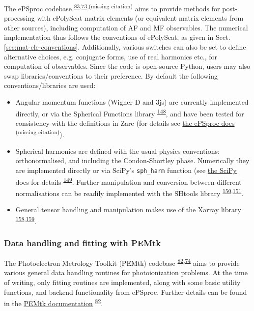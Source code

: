 \documentclass[10pt]{article}
\begin{document}
The ePSproc codebase \textsuperscript{\hyperref[csl:83]{83},\hyperref[csl:73]{73},(missing citation)} aims to provide methods for post-processing with ePolyScat matrix elements (or equivalent matrix elements from other sources), including computation of AF and MF observables. The numerical implementation thus follows the conventions of ePolyScat, as given in Sect. \ref{sec:mat-ele-conventions}. Additionally, various switches can also be set to define alternative choices, e.g. conjugate forms, use of real harmonics etc., for computation of observables. Since the code is open-source Python, users may also swap libraries/conventions to their preference. By default the following conventions/libraries are used:

\begin{itemize}
\item Angular momentum functions (Wigner D and 3js) are currently implemented directly, or via the Spherical Functions library \textsuperscript{\hyperref[csl:148]{148}}, and have been tested for consistency with the definitions in Zare (for details see \href{https://epsproc.readthedocs.io/en/latest/tests/Spherical_function_testing_Aug_2019.html}{the ePSproc docs} \textsuperscript{(missing citation)}).
\item Spherical harmonics are defined with the usual physics conventions: orthonormalised, and including the Condon-Shortley phase. Numerically they are implemented directly or via SciPy's \verb+sph_harm+  function (see \href{https://docs.scipy.org/doc/scipy/reference/generated/scipy.special.sph_harm.html}{the SciPy docs for details} \textsuperscript{\hyperref[csl:149]{149}}. Further manipulation and conversion between different normalisations can be readily implemented with the SHtools library \textsuperscript{\hyperref[csl:150]{150},\hyperref[csl:151]{151}}.
\item General tensor handling and manipulation makes use of the Xarray library \textsuperscript{\hyperref[csl:158]{158},\hyperref[csl:159]{159}}.
\end{itemize}


\subsubsection{Data handling and fitting with PEMtk}

The Photoelectron Metrology Toolkit (PEMtk) codebase \textsuperscript{\hyperref[csl:82]{82},\hyperref[csl:74]{74}} aims to provide various general data handling routines for photoionization problems. At the time of writing, only fitting routines are implemented, along with some basic utility functions, and backend functionality from ePSproc. Further details can be found in the \href{https://pemtk.readthedocs.io/en/latest/about.html}{PEMtk documentation} \textsuperscript{\hyperref[csl:82]{82}}.
\end{document}
